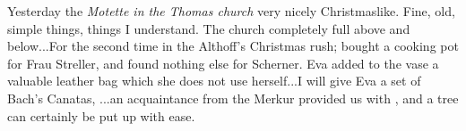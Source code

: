 
Yesterday the \textit{Motette in the Thomas church} very nicely Christmaslike. Fine, old, simple things, things I understand. The church completely full above and below...For the second time in the Althoff's Christmas rush; bought a cooking pot for Frau Streller, and found nothing else for Scherner. Eva added to the vase a valuable leather bag which she does not use herself...I will give Eva a set of Bach's Canatas, ...an acquaintance from the Merkur provided us with , and a tree can certainly be put up with ease.